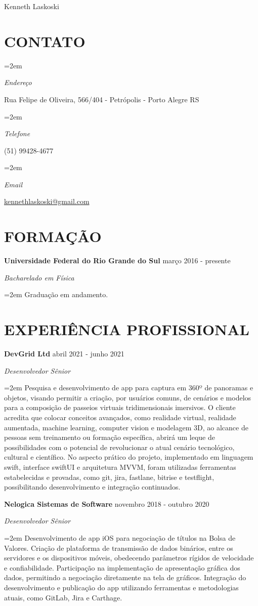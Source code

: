 \documentclass[paper=a4,fontsize=11pt]{scrartcl} %
\newlength{\spacebox}
\newcommand{\sepspace}{\vspace*{1em}}		%
\newcommand{\MyName}[1]{ %
		\Huge \usefont{OT1}{phv}{b}{n} \hfill #1
		\par \normalsize \normalfont}
\newcommand{\MySlogan}[1]{ %
		\large \usefont{OT1}{phv}{m}{n}\hfill \textit{#1}
		\par \normalsize \normalfont}
\newcommand{\NewPart}[1]{\section*{\uppercase{#1}}}
\newcommand{\PersonalEntry}[2]{
		\noindent\hangindent=2em\hangafter=0 %
		\parbox{\spacebox}{        %
		\textit{#1}}		       %
		\hspace{1.5em} #2 \par}    %
\newcommand{\EducationEntry}[4]{
		\noindent \textbf{#1} \hfill      %
        #2 \par
		\noindent \textit{#3} \par        %
		\noindent\hangindent=2em\hangafter=0 \small #4 %
		\normalsize \par}
\newcommand{\WorkEntry}[4]{				  %
		\noindent \textbf{#1} \hfill      %
        #2 \par
		\noindent \textit{#3} \par        %
		\noindent\hangindent=2em\hangafter=0 \small #4 %
		\normalsize \par}
\begin{document}

\MyName{Kenneth Laskoski}

\sepspace

\NewPart{Contato}{}

\PersonalEntry{Endereço}{Rua Felipe de Oliveira, 566/404 - Petrópolis - Porto Alegre RS}
\PersonalEntry{Telefone}{(51) 99428-4677}
\PersonalEntry{Email}{\url{kennethlaskoski@gmail.com}}

\NewPart{Formação}{}

\EducationEntry{Universidade Federal do Rio Grande do Sul}{março 2016 - presente}{Bacharelado em Física}{Graduação em andamento.}
\sepspace

\NewPart{Experiência Profissional}{}

\WorkEntry{DevGrid Ltd}{abril 2021 - junho 2021}{Desenvolvedor Sênior}{Pesquisa e desenvolvimento de app para captura em 360º de panoramas e objetos, visando permitir a criação, por usuários comuns, de cenários e modelos para a composição de passeios virtuais tridimensionais imersivos. O cliente acredita que colocar conceitos avançados, como realidade virtual, realidade aumentada, machine learning, computer vision e modelagem 3D, ao alcance de pessoas sem treinamento ou formação específica, abrirá um leque de possibilidades com o potencial de revolucionar o atual cenário tecnológico, cultural e científico. No aspecto prático do projeto, implementado em linguagem swift, interface swiftUI e arquitetura MVVM, foram utilizadas ferramentas estabelecidas e provadas, como git, jira, fastlane, bitrise e testflight, possibilitando desenvolvimento e integração continuados.}
\sepspace
\sepspace

\WorkEntry{Nelogica Sistemas de Software}{novembro 2018 - outubro 2020}{Desenvolvedor Sênior}{Desenvolvimento de app iOS para negociação de títulos na Bolsa de Valores. Criação de plataforma de transmissão de dados binários, entre os servidores e os dispositivos móveis, obedecendo parâmetros rígidos de velocidade e confiabilidade. Participação na implementação de apresentação gráfica dos dados, permitindo a negociação diretamente na tela de gráficos. Integração do desenvolvimento e publicação do app utilizando ferramentas e metodologias atuais, como GitLab, Jira e Carthage.}
\sepspace
\sepspace
\end{document}
